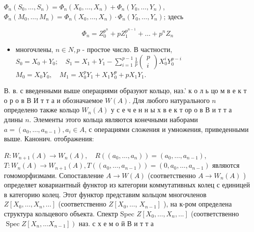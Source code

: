 \documentclass[10pt]{article}
\begin{document}
$\Phi_{n}\left(S_{0}, \ldots, S_{n}\right)=\Phi_{n}\left(X_{0}, \ldots, X_{n}\right)+\Phi_{n}\left(Y_{0}, \ldots, Y_{n}\right)$, $\Phi_{n}\left(M_{0}, \ldots, M_{n}\right)=\Phi_{n}\left(X_{0}, \ldots, X_{n}\right) \cdot \Phi_{n}\left(Y_{0}, \ldots, Y_{n}\right)$; здесь



\[

\Phi_{n}=Z_{0}^{p^{n}}+p Z_{1}^{p^{n-1}}+\ldots+p^{n} Z_{n}

\]



\begin{itemize}

  \item многочлены, $n \in N, p$ - простое число. В частности, $S_{0}=X_{0}+Y_{0} ; \quad S_{1}=X_{1}+Y_{1}-\sum_{i=1}^{p-1} \frac{1}{p}\left(\begin{array}{c}p \\ i\end{array}\right) X_{0}^{i} Y_{0}^{p-i}$ $M_{0}=X_{0} Y_{0}, \quad M_{1}=X_{0}^{p} Y_{1}+X_{1} Y_{0}^{p}+p X_{1} Y_{1}$.

\end{itemize}



В. в. с введенными выше операциями образуют кольцо, наз.' к о л ь цо м в е к т о р о в В И т т а и обозначаемое $W(A)$. Для любого натурального $n$ определено также кольцо $W_{n}(A)$ у с е ч е н н ы х в е к т ор о в В и т т а длины $n$. Элементы этого кольца являются конечными наборами $a=\left(a_{0}, \ldots, a_{n-1}\right), a_{i} \in A$, с операциями сложения и умножения, приведенными выше. Канонич. отображения:



$R: W_{n+1}(A) \longrightarrow W_{n}(A), \quad R\left(\left(a_{0}, \ldots, a_{n}\right)\right)=\left(a_{0}, \ldots, a_{n-1}\right)$, $T: W_{n}(A) \longrightarrow W_{n+1}(A), T\left(\left(a_{0}, \ldots, a_{n-1}\right)\right)=\left(0, a_{0}, \ldots, a_{n-1}\right)$ являются гомоморфизмами. Сопоставление $A \rightarrow W(A)$ (соответственно $A \rightarrow W_{n}(A)$ ) определяет ковариантный функтор из категории коммутативных колец с единицей в категорию колец. Этот функтор представим кольцом многочленов $Z\left[X_{0}, \ldots, X_{n}, \ldots\right]$ (соответственно $Z\left[X_{0}, \ldots\right.$, $\left.X_{n-1}\right]$ ), на к-ром определена структура кольцевого объекта. Спектр Spec $Z\left[X_{0}, \ldots, X_{n}, . ..\right]$ (соответственно $\left.\operatorname{Spec} Z\left[X_{n}, . . . X_{n-1}\right]\right)$ наз. с х е м о й В и т т а
\end{document}
